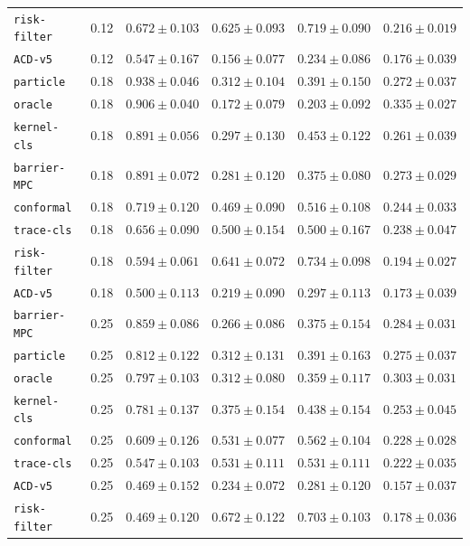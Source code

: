 \documentclass{article}
\begin{document}
\begin{center}
{\begin{tabular}{llcccc}
\texttt{risk-filter} & 0.12 & $0.672 \pm 0.103$ & $0.625 \pm 0.093$ & $0.719 \pm 0.090$ & $0.216 \pm 0.019$ \\
\texttt{ACD-v5} & 0.12 & $0.547 \pm 0.167$ & $0.156 \pm 0.077$ & $0.234 \pm 0.086$ & $0.176 \pm 0.039$ \\
\texttt{particle} & 0.18 & $0.938 \pm 0.046$ & $0.312 \pm 0.104$ & $0.391 \pm 0.150$ & $0.272 \pm 0.037$ \\
\texttt{oracle} & 0.18 & $0.906 \pm 0.040$ & $0.172 \pm 0.079$ & $0.203 \pm 0.092$ & $0.335 \pm 0.027$ \\
\texttt{kernel-cls} & 0.18 & $0.891 \pm 0.056$ & $0.297 \pm 0.130$ & $0.453 \pm 0.122$ & $0.261 \pm 0.039$ \\
\texttt{barrier-MPC} & 0.18 & $0.891 \pm 0.072$ & $0.281 \pm 0.120$ & $0.375 \pm 0.080$ & $0.273 \pm 0.029$ \\
\texttt{conformal} & 0.18 & $0.719 \pm 0.120$ & $0.469 \pm 0.090$ & $0.516 \pm 0.108$ & $0.244 \pm 0.033$ \\
\texttt{trace-cls} & 0.18 & $0.656 \pm 0.090$ & $0.500 \pm 0.154$ & $0.500 \pm 0.167$ & $0.238 \pm 0.047$ \\
\texttt{risk-filter} & 0.18 & $0.594 \pm 0.061$ & $0.641 \pm 0.072$ & $0.734 \pm 0.098$ & $0.194 \pm 0.027$ \\
\texttt{ACD-v5} & 0.18 & $0.500 \pm 0.113$ & $0.219 \pm 0.090$ & $0.297 \pm 0.113$ & $0.173 \pm 0.039$ \\
\texttt{barrier-MPC} & 0.25 & $0.859 \pm 0.086$ & $0.266 \pm 0.086$ & $0.375 \pm 0.154$ & $0.284 \pm 0.031$ \\
\texttt{particle} & 0.25 & $0.812 \pm 0.122$ & $0.312 \pm 0.131$ & $0.391 \pm 0.163$ & $0.275 \pm 0.037$ \\
\texttt{oracle} & 0.25 & $0.797 \pm 0.103$ & $0.312 \pm 0.080$ & $0.359 \pm 0.117$ & $0.303 \pm 0.031$ \\
\texttt{kernel-cls} & 0.25 & $0.781 \pm 0.137$ & $0.375 \pm 0.154$ & $0.438 \pm 0.154$ & $0.253 \pm 0.045$ \\
\texttt{conformal} & 0.25 & $0.609 \pm 0.126$ & $0.531 \pm 0.077$ & $0.562 \pm 0.104$ & $0.228 \pm 0.028$ \\
\texttt{trace-cls} & 0.25 & $0.547 \pm 0.103$ & $0.531 \pm 0.111$ & $0.531 \pm 0.111$ & $0.222 \pm 0.035$ \\
\texttt{ACD-v5} & 0.25 & $0.469 \pm 0.152$ & $0.234 \pm 0.072$ & $0.281 \pm 0.120$ & $0.157 \pm 0.037$ \\
\texttt{risk-filter} & 0.25 & $0.469 \pm 0.120$ & $0.672 \pm 0.122$ & $0.703 \pm 0.103$ & $0.178 \pm 0.036$ \\
\bottomrule
\end{tabular}%
}
\end{center}
\normalsize
\end{document}
